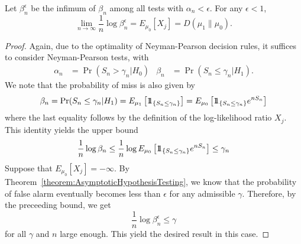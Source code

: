 \begin{theorem}[Stein]
Let $\beta^{\epsilon}_n$ be the infimum of $\beta_n$ among all tests with $\alpha_n < \epsilon$.
For any $\epsilon < 1$,
\begin{equation*}
\lim_{n \rightarrow \infty} \frac{1}{n} \log \beta_n^{\epsilon}
= E_{\mu_0} [ X_j ] = D ( \mu_1 \| \mu_0 ) .
\end{equation*}
\end{theorem}
\begin{proof}
Again, due to the optimality of Neyman-Pearson decision rules, it suffices to consider Neyman-Pearson tests, with
\begin{align*}
\alpha_n &= \Pr (S_n > \gamma_n | H_0) & \beta_n &= \Pr (S_n \leq \gamma_n | H_1) .
\end{align*}
We note that the probability of miss is also given by
\begin{equation*}
\beta_n = \Pr (S_n \leq \gamma_n | H_1)
= E_{\mu_1} \left[ \mathrm{1\!\!1}_{\{ S_n \leq \gamma_n \}} \right]
= E_{\mu_0} \left[ \mathrm{1\!\!1}_{\{ S_n \leq \gamma_n \}} e^{n S_n} \right]
\end{equation*}
where the last equality follows by the definition of the log-likelihood ratio $X_j$.
This identity yields the upper bound
\begin{equation*}
\frac{1}{n} \log \beta_n
\leq \frac{1}{n} \log E_{\mu_0} \left[ \mathrm{1\!\!1}_{\{ S_n \leq \gamma_n \}} e^{n S_n} \right]
\leq \gamma_n
\end{equation*}
Suppose that $E_{\mu_0} [X_j] = - \infty$.
By Theorem~\ref{theorem:AsymptoticHypothesisTesting}, we know that the probability of false alarm eventually becomes less than $\epsilon$ for any admissible $\gamma$.
Therefore, by the preceeding bound, we get
\begin{equation*}
\frac{1}{n} \log \beta_n^{\epsilon} \leq \gamma
\end{equation*}
for all $\gamma$ and $n$ large enough.
This yield the desired result in this case.


\end{proof}
